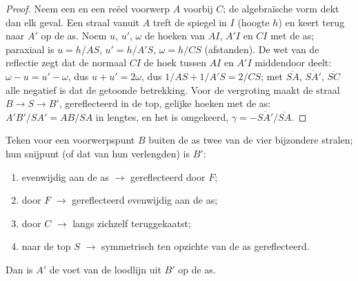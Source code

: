 \begin{proof}
Neem een  en een reëel voorwerp $A$ voorbij $C$; de algebraïsche
vorm dekt dan elk geval. Een straal vanuit $A$ treft de spiegel in $I$
(hoogte $h$) en keert terug naar $A'$ op de as. Noem $u$, $u'$, $\omega$
de hoeken van $AI$, $A'I$ en $CI$ met de as; paraxiaal is
$u = h/AS$, $u' = h/A'S$, $\omega = h/CS$ (afstanden). De wet van de
reflectie zegt dat de normaal $CI$ de hoek tussen $AI$ en $A'I$ middendoor
deelt: $\omega - u = u' - \omega$, dus $u + u' = 2\omega$, dus
$1/AS + 1/A'S = 2/CS$; met $\overline{SA}$, $\overline{SA'}$,
$\overline{SC}$ alle negatief is dat de getoonde betrekking. Voor de
vergroting maakt de straal $B \to S \to B'$, gereflecteerd in de top, gelijke
hoeken met de as: $A'B'/SA' = AB/SA$ in lengtes, en het  is omgekeerd,
$\gamma = -\overline{SA'}/\overline{SA}$.
\end{proof}

\begin{method}\label{met:b1:mirrors-thin-lenses:mirrorrays}
Teken voor een voorwerpspunt $B$ buiten de as twee van de vier bijzondere
stralen; hun snijpunt (of dat van hun verlengden) is $B'$:
\begin{enumerate}
  \item evenwijdig aan de as $\to$ gereflecteerd door $F$;
  \item door $F$ $\to$ gereflecteerd evenwijdig aan de as;
  \item door $C$ $\to$ langs zichzelf teruggekaatst;
  \item naar de top $S$ $\to$ symmetrisch ten opzichte van de as gereflecteerd.
\end{enumerate}
Dan is $A'$ de voet van de loodlijn uit $B'$ op de as.
\end{method}

